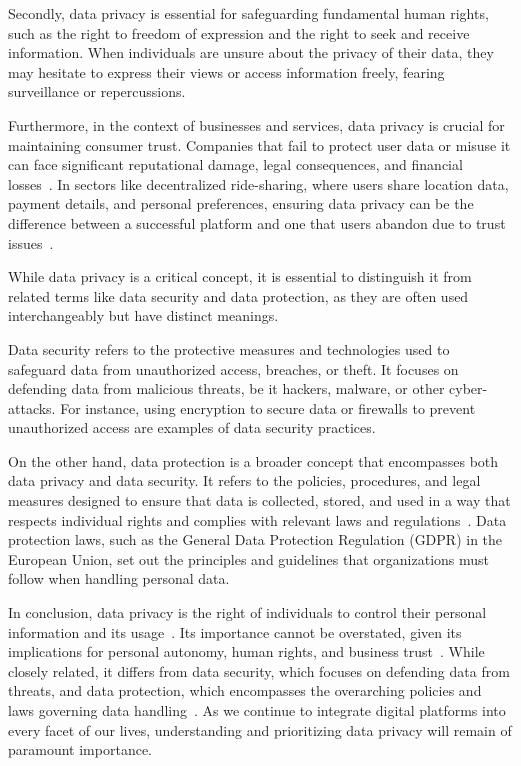 Secondly, data privacy is essential for safeguarding fundamental human rights, such as the right to freedom of expression and the right to seek and receive information. When individuals are unsure about the privacy of their data, they may hesitate to express their views or access information freely, fearing surveillance or repercussions.

Furthermore, in the context of businesses and services, data privacy is crucial for maintaining consumer trust. Companies that fail to protect user data or misuse it can face significant reputational damage, legal consequences, and financial losses~\cite{Li.2019}. In sectors like decentralized ride-sharing, where users share location data, payment details, and personal preferences, ensuring data privacy can be the difference between a successful platform and one that users abandon due to trust issues~\cite{Li.2019}.

While data privacy is a critical concept, it is essential to distinguish it from related terms like data security and data protection, as they are often used interchangeably but have distinct meanings.

Data security refers to the protective measures and technologies used to safeguard data from unauthorized access, breaches, or theft. It focuses on defending data from malicious threats, be it hackers, malware, or other cyber-attacks. For instance, using encryption to secure data or firewalls to prevent unauthorized access are examples of data security practices.

On the other hand, data protection is a broader concept that encompasses both data privacy and data security. It refers to the policies, procedures, and legal measures designed to ensure that data is collected, stored, and used in a way that respects individual rights and complies with relevant laws and regulations~\cite{Covert.2020}. Data protection laws, such as the General Data Protection Regulation (GDPR) in the European Union, set out the principles and guidelines that organizations must follow when handling personal data.

In conclusion, data privacy is the right of individuals to control their personal information and its usage~\cite{Covert.2020}. Its importance cannot be overstated, given its implications for personal autonomy, human rights, and business trust~\cite{Li.2019}. While closely related, it differs from data security, which focuses on defending data from threats, and data protection, which encompasses the overarching policies and laws governing data handling~\cite{Covert.2020}. As we continue to integrate digital platforms into every facet of our lives, understanding and prioritizing data privacy will remain of paramount importance.

